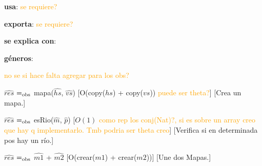 \begin{Interfaz}
  
    \textbf{usa}: \textcolor{orange}{se requiere?}

    \textbf{exporta}: \textcolor{orange}{se requiere?}

    \textbf{se explica con}: 
  
    \textbf{géneros}: 
  
  
    \textcolor{orange}{no se si hace falta agregar para los obs?}

    {$\hat{res}$ $=_{\mathrm{obs}}$ mapa($\hat{hs}$, $\hat{vs}$)}%
    [O(copy($hs$) + copy($vs$)) \textcolor{orange}{puede ser theta?}]
    [Crea un mapa.]

    {$\hat{res}$ $=_{\mathrm{obs}}$ esRio($\hat{m}$, $\hat{p}$)}%
    [$O(1)$ \textcolor{orange}{como rep los conj(Nat)?, si es sobre un array creo que hay q implementarlo. Tmb podria ser theta creo}]
    [Verifica si en determinada pos hay un río.] 

    {$\hat{res}$ $=_{\mathrm{obs}}$ $\hat{m1}$ + $\hat{m2}$}%
    [O(crear($m1$) + crear($m2$))]
    [Une dos Mapas.] 

  \end{Interfaz}
